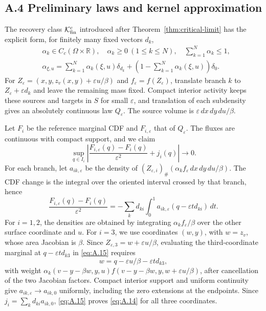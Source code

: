\subsection{A.4 Preliminary laws and kernel approximation}\label{proof:preliminary-cdf}
The recovery class \(\mathcal K_{\rm fin}^c\) introduced after Theorem~\ref{thm:critical-limit} has the explicit form, for finitely many fixed vectors \(d_k\),
\begin{equation}
\begin{aligned}
&\alpha_k\in C_c(\Omega\times\mathbb R),\quad
\alpha_k\ge0\ (1\le k\le N),\quad\sum_{k=1}^N\alpha_k\le1,\\
&\alpha_{\xi,u}=\sum_{k=1}^N\alpha_k(\xi,u)\delta_{d_k}
+\left(1-\sum_{k=1}^N\alpha_k(\xi,u)\right)\delta_0.
\end{aligned}
\tag{A.13}\label{eq:A.13}
\end{equation}
For \(Z_\varepsilon=(x,y,z_v(x,y)+\varepsilon u/\beta)\) and \(f_\varepsilon=f(Z_\varepsilon)\), translate branch \(k\) to \(Z_\varepsilon+\varepsilon d_k\) and leave the remaining mass fixed. Compact interior activity keeps these sources and targets in \(S\) for small \(\varepsilon\), and translation of each subdensity gives an absolutely continuous law \(Q_\varepsilon\). The source volume is \(\varepsilon\,dx\,dy\,du/\beta\).

Let \(F_i\) be the reference marginal CDF and \(F_{i,\varepsilon}\) that of \(Q_\varepsilon\). The fluxes are continuous with compact support, and we claim
\begin{equation}
\sup_{q\in I_i}
\left|\frac{F_{i,\varepsilon}(q)-F_i(q)}{\varepsilon^2}+j_i(q)\right|\to0.
\tag{A.14}\label{eq:A.14}
\end{equation}
For each branch, let \(a_{ik,\varepsilon}\) be the density of
\((Z_{\varepsilon,i})_\#(\alpha_k f_\varepsilon\,dx\,dy\,du/\beta)\).
The CDF change is the integral over the oriented interval crossed by that branch, hence
\begin{equation}
\frac{F_{i,\varepsilon}(q)-F_i(q)}{\varepsilon^2}
=-\sum_kd_{ki}\int_0^1a_{ik,\varepsilon}(q-\varepsilon t d_{ki})\,dt.
\tag{A.15}\label{eq:A.15}
\end{equation}
For \(i=1,2\), the densities are obtained by integrating \(\alpha_k f_\varepsilon/\beta\) over the other surface coordinate and \(u\). For \(i=3\), we use coordinates \((w,y)\), with \(w=z_v\), whose area Jacobian is \(\beta\). Since \(Z_{\varepsilon,3}=w+\varepsilon u/\beta\), evaluating the third-coordinate marginal at \(q-\varepsilon t d_{k3}\) in \eqref{eq:A.15} requires
\begin{equation}
w=q-\varepsilon u/\beta-\varepsilon t d_{k3},
\tag{A.16}\label{eq:A.16}
\end{equation}
with weight \(\alpha_k(v-y-\beta w,y,u)f(v-y-\beta w,y,w+\varepsilon u/\beta)\), after cancellation of the two Jacobian factors. Compact interior support and uniform continuity give \(a_{ik,\varepsilon}\to a_{ik,0}\) uniformly, including the zero extensions at the endpoints. Since \(j_i=\sum_kd_{ki}a_{ik,0}\), \eqref{eq:A.15} proves \eqref{eq:A.14} for all three coordinates.

